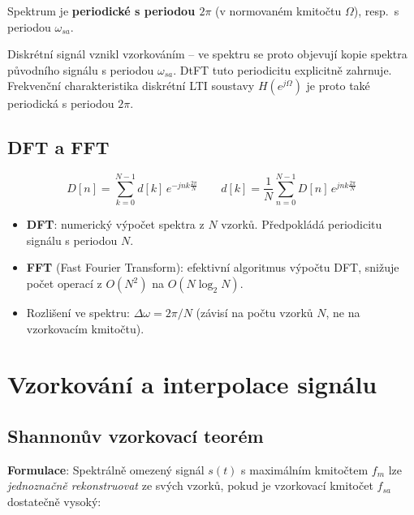 \documentclass[12pt,a4paper]{article}
\begin{document}
Spektrum je \textbf{periodické s periodou $2\pi$} (v normovaném kmitočtu $\Omega$), resp.\ s periodou $\omega_{sa}$.

\begin{noteBox}
Diskrétní signál vznikl vzorkováním – ve spektru se proto objevují kopie spektra původního signálu s periodou $\omega_{sa}$. DtFT tuto periodicitu explicitně zahrnuje.\\
Frekvenční charakteristika diskrétní LTI soustavy $H(e^{j\Omega})$ je proto také periodická s periodou $2\pi$.
\end{noteBox}

\subsection*{DFT a FFT}

\begin{matBox}
\[
  D[n] = \sum_{k=0}^{N-1} d[k]\, e^{-jnk\frac{2\pi}{N}}
  \qquad
  d[k] = \frac{1}{N}\sum_{n=0}^{N-1} D[n]\, e^{jnk\frac{2\pi}{N}}
\]
\end{matBox}

\begin{itemize}
  \item \textbf{DFT}: numerický výpočet spektra z $N$ vzorků. Předpokládá periodicitu signálu s periodou $N$.
  \item \textbf{FFT} (Fast Fourier Transform): efektivní algoritmus výpočtu DFT, snižuje počet operací z $O(N^2)$ na $O(N\log_2 N)$.
  \item Rozlišení ve spektru: $\Delta\omega = 2\pi/N$ (závisí na počtu vzorků $N$, ne na vzorkovacím kmitočtu).
\end{itemize}

\newpage
\section{Vzorkování a interpolace signálu}

\begin{hvezdBox}
\subsection*{Shannonův vzorkovací teorém}
\end{hvezdBox}

\textbf{Formulace}: Spektrálně omezený signál $s(t)$ s maximálním kmitočtem $f_m$ lze \emph{jednoznačně rekonstruovat} ze svých vzorků, pokud je vzorkovací kmitočet $f_{sa}$ dostatečně vysoký:
\end{document}
